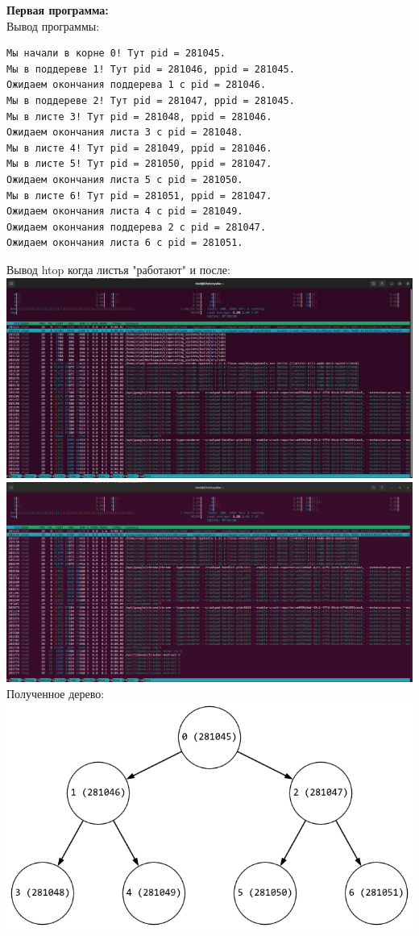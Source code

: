 \documentclass[a4paper,14pt]{extarticle}
\begin{document}
\textbf{Первая программа:}\\
Вывод программы:\\
\begin{verbatim}
Мы начали в корне 0! Тут pid = 281045.
Мы в поддереве 1! Тут pid = 281046, ppid = 281045.
Ожидаем окончания поддерева 1 с pid = 281046.
Мы в поддереве 2! Тут pid = 281047, ppid = 281045.
Мы в листе 3! Тут pid = 281048, ppid = 281046.
Ожидаем окончания листа 3 с pid = 281048.
Мы в листе 4! Тут pid = 281049, ppid = 281046.
Мы в листе 5! Тут pid = 281050, ppid = 281047.
Ожидаем окончания листа 5 с pid = 281050.
Мы в листе 6! Тут pid = 281051, ppid = 281047.
Ожидаем окончания листа 4 с pid = 281049.
Ожидаем окончания поддерева 2 с pid = 281047.
Ожидаем окончания листа 6 с pid = 281051.
\end{verbatim}
Вывод htop когда листья "работают" и после:\\
\includegraphics[width=140mm]{main_htop_before}\\
\includegraphics[width=140mm]{main_htop_after}\\
Полученное дерево:\\
\includegraphics[width=140mm]{main.png}\\
\end{document}
